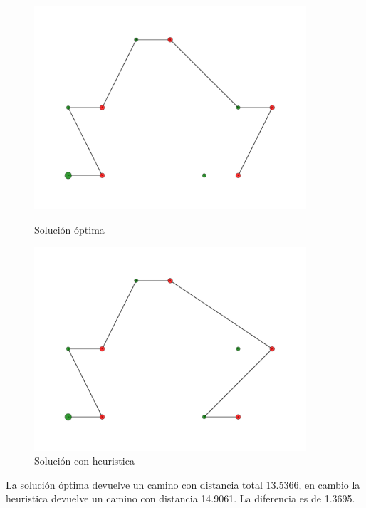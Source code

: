 \begin{figure}[H]
\centering
\begin{minipage}{0.45\textwidth}
\centering
\includegraphics[width=0.9\textwidth]{imagenes/test2-soltest2BT.pdf}
\caption{Solución óptima}
\label{fig:ej2_caso2bt}
\end{minipage}
\qquad
\begin{minipage}{0.45\textwidth}
\centering
\includegraphics[width=0.9\textwidth]{imagenes/test2-soltest2H.pdf}
\caption{Solución con heuristica}
\label{fig:ej2_caso2h}
\end{minipage}
\end{figure}

La solución óptima devuelve un camino con distancia total 13.5366, en cambio la heuristica devuelve un camino con distancia 14.9061. La diferencia es de 1.3695.



